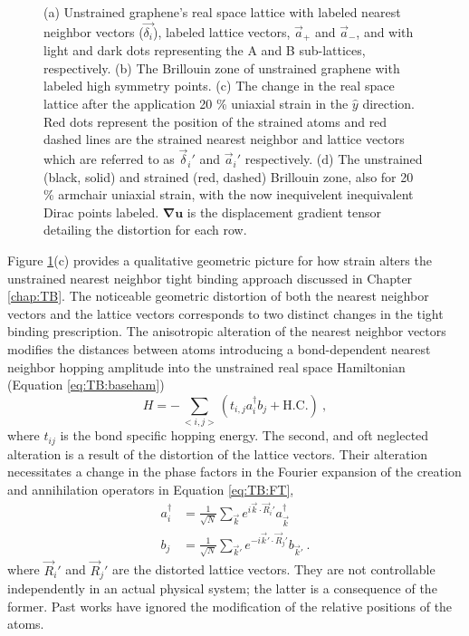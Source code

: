 \begin{figure}
  
  \caption{\label{fig:PVP:lattice} (a) Unstrained graphene's real space lattice with labeled nearest neighbor vectors ($\vec{\delta_i}$), labeled lattice vectors, $\vec{a}_+$ and  $\vec{a}_-$, and with light and dark dots representing the A and B sub-lattices, respectively. (b) The Brillouin zone of unstrained graphene with labeled high symmetry points. (c) The change in the real space lattice after the application 20 \% uniaxial strain in the $\hat{y}$ direction.  Red dots represent the position of the strained atoms and red dashed lines are the strained nearest neighbor and lattice vectors which are referred to as $\vec{\delta}_i'$ and $\vec{a}_i'$ respectively.  (d) The unstrained (black, solid) and strained (red, dashed) Brillouin zone, also for 20 \% armchair uniaxial strain, with the now inequivelent inequivalent Dirac points labeled.  $\bm{\nabla u}$ is the displacement gradient tensor detailing the distortion for each row.}
\end{figure}

Figure \ref{fig:PVP:lattice}(c) provides a qualitative geometric picture for how strain alters the unstrained nearest neighbor tight binding approach discussed in Chapter \ref{chap:TB}.
The noticeable geometric distortion of both the nearest neighbor vectors and the lattice vectors corresponds to two distinct changes in the tight binding prescription.
The anisotropic alteration of the nearest neighbor vectors modifies the distances between atoms introducing a bond-dependent nearest neighbor hopping amplitude into the unstrained real space Hamiltonian (Equation \ref{eq:TB:baseham})\cite{Hasegawa2006}
\begin{equation}
  H=-\sum_{<i,j>} (t_{i,j} a_i^{\dagger} b_j + \text{H.C.}) \ ,
  \label{eq:PVP:RealSpace}
\end{equation}
where $t_{ij}$ is the bond specific hopping energy.
The second, and oft neglected alteration is a result of the distortion of the lattice vectors.
Their alteration necessitates a change in the phase factors in the Fourier expansion of the creation and annihilation operators in Equation \ref{eq:TB:FT},
\begin{align}
  a_i^{\dagger}&=\frac{1}{\sqrt{N}}\sum_{\vec{k} } e^{ i \vec{k}  \cdot \vec{R}_i'} a_{\vec{k} }^{\dagger} \nonumber \\
  b_j          &=\frac{1}{\sqrt{N}}\sum_{\vec{k}'} e^{-i \vec{k}' \cdot \vec{R}_j'} b_{\vec{k}'} \ . \label{eq:PVP:FT} 
\end{align}
where $\vec{R}_i'$ and $\vec{R}_j'$ are the distorted lattice vectors.
They are not controllable independently in an actual physical system; the latter is a consequence of the former.
Past works have ignored the modification of the relative positions of the atoms.

